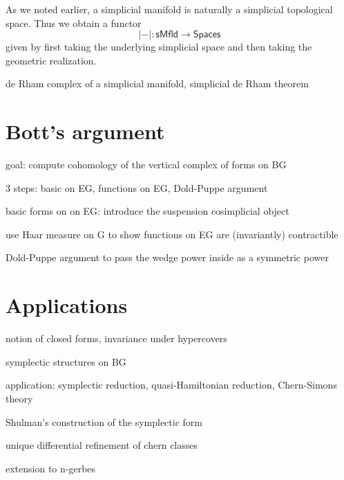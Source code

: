 \documentclass{amsart}
\begin{document}
As we noted earlier, a simplicial manifold is naturally a simplicial topological 
space. Thus we obtain a functor
\begin{equation*}
    |-| : \mathsf{sMfld} \to \mathsf{Spaces}
\end{equation*}
given by first taking the underlying simplicial space and then taking the 
geometric realization.

de Rham complex of a simplicial manifold, simplicial de Rham theorem

\section{Bott's argument}

goal: compute cohomology of the vertical complex of forms on BG

3 steps: basic on EG, functions on EG, Dold-Puppe argument

basic forms on on EG: introduce the suspension cosimplicial object

use Haar measure on G to show functions on EG are (invariantly) contractible

Dold-Puppe argument to pass the wedge power inside as a symmetric power

\section{Applications}

notion of closed forms, invariance under hypercovers

symplectic structures on BG

application: symplectic reduction, quasi-Hamiltonian reduction, Chern-Simons 
theory

Shulman's construction of the symplectic form

unique differential refinement of chern classes

extension to n-gerbes
\end{document}
